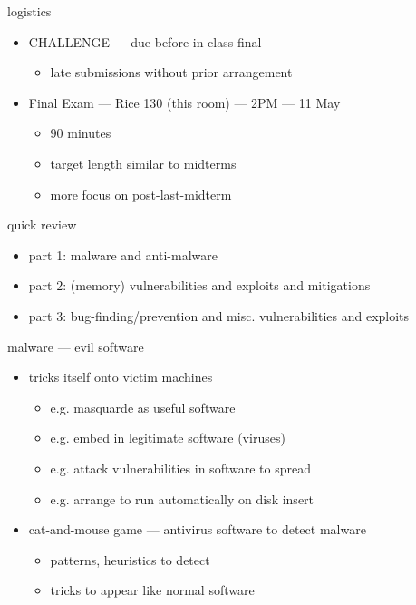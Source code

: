 \begin{frame}
    \titlepage
\end{frame}
\usetikzlibrary{graphdrawing}
\usetikzlibrary{graphs}


\begin{frame}{logistics}
    \begin{itemize}
    \item CHALLENGE --- due before in-class final
        \begin{itemize}
            \item late submissions  without prior arrangement
        \end{itemize}
    \item Final Exam --- Rice 130 (this room) --- 2PM --- 11 May
        \begin{itemize}
            \item 90 minutes
            \item target length similar to midterms
            \item more focus on post-last-midterm
        \end{itemize}
    \end{itemize}
\end{frame}

\begin{frame}{quick review}
    \begin{itemize}
    \item part 1: malware and anti-malware
    \item part 2: (memory) vulnerabilities and exploits and mitigations
    \item part 3: bug-finding/prevention and misc. vulnerabilities and exploits
    \end{itemize}
\end{frame}

\begin{frame}{malware --- evil software}
    \begin{itemize}
        \item tricks itself onto victim machines
            \begin{itemize}
            \item e.g. masquarde as useful software
            \item e.g. embed in legitimate software (viruses)
            \item e.g. attack vulnerabilities in software to spread
            \item e.g. arrange to run automatically on disk insert
            \end{itemize}
        \item cat-and-mouse game --- antivirus software to detect malware
            \begin{itemize}
            \item patterns, heuristics to detect
            \item tricks to appear like normal software
            \end{itemize}
    \end{itemize}
\end{frame}

